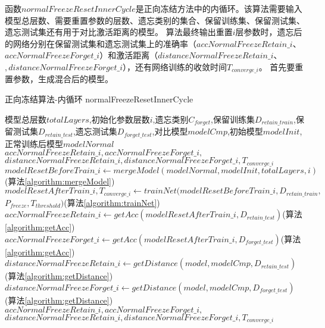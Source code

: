 函数$normalFreezeResetInnerCycle$是正向冻结方法中的内循环。该算法需要输入模型总层数、需要重置参数的层数、遗忘类别的集合、保留训练集、保留测试集、遗忘测试集还有用于对比激活距离的模型。
算法最终输出重置$i$层参数时，遗忘后的网络分别在保留测试集和遗忘测试集上的准确率（$accNormalFreezeRetain\_i$、$accNormalFreezeForget\_i$）和激活距离（$distanceNormalFreezeRetain\_i$、$,distanceNormalFreezeForget\_i$），还有网络训练的收敛时间$T_{converge\_i}$。
首先要重置参数，生成混合后的模型。
\begin{algorithm}
	\renewcommand{\algorithmicrequire}{\textbf{Input:}}
	\renewcommand{\algorithmicensure}{\textbf{Output:}}
	\caption{正向冻结算法-内循环 normalFreezeResetInnerCycle}
	\label{algorithm:normalFreezeResetInnerCycle}
	\begin{algorithmic}[1]
        \REQUIRE 模型总层数$totalLayers$,初始化参数层数$i$,遗忘类别$C_{forget}$,保留训练集$D_{retain\_train}$,保留测试集$D_{retain\_test}$,遗忘测试集$D_{forget\_test}$,对比模型$modelCmp$,初始模型$modelInit$,正常训练后模型$modelNormal$
        \ENSURE  $accNormalFreezeRetain\_i,accNormalFreezeForget\_i,$\\$distanceNormalFreezeRetain\_i,distanceNormalFreezeForget\_i,T_{converge\_i}$
		\STATE $modelResetBeforeTrain\_i \gets mergeModel(modelNormal, modelInit, totalLayers, i)$(算法\ref{algorithm:mergeModel})
        \STATE $modelResetAfterTrain\_i,T_{converge\_i} \gets trainNet(modelResetBeforeTrain\_i , D_{retain\_train},$\\$ P_{freeze}, T_{threshold})$(算法\ref{algorithm:trainNet})
        \STATE $accNormalFreezeRetain\_i \gets getAcc(modelResetAfterTrain\_i, D_{retain\_test})$(算法\ref{algorithm:getAcc})
        \STATE $accNormalFreezeForget\_i  \gets getAcc(modelResetAfterTrain\_i, D_{forget\_test})$(算法\ref{algorithm:getAcc})
        \STATE $distanceNormalFreezeRetain\_i \gets getDistance(model, modelCmp, D_{retain\_test})$(算法\ref{algorithm:getDistance})
        \STATE $distanceNormalFreezeForget\_i \gets getDistance(model, modelCmp, D_{forget\_test})$(算法\ref{algorithm:getDistance})
        \RETURN $accNormalFreezeRetain\_i,accNormalFreezeForget\_i,$\\$distanceNormalFreezeRetain\_i,distanceNormalFreezeForget\_i,T_{converge\_i}$
	\end{algorithmic}  
\end{algorithm}

